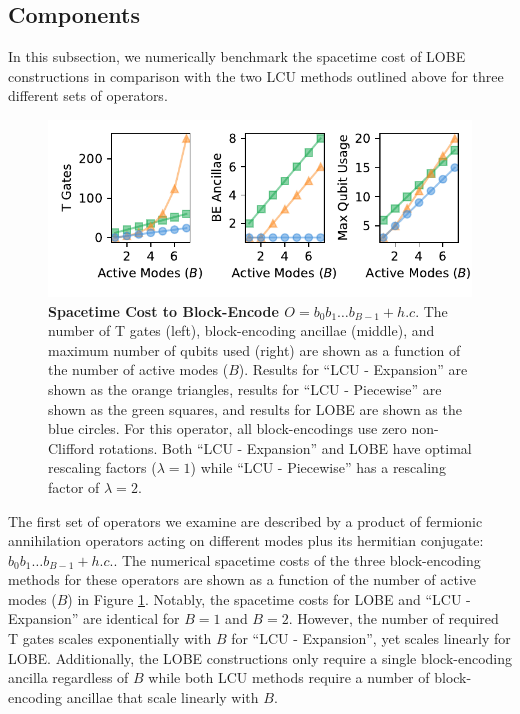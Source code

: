 \subsection{Components}

In this subsection, we numerically benchmark the spacetime cost of LOBE constructions in comparison with the two LCU methods outlined above for three different sets of operators.

\begin{figure}
    \centering
    \includegraphics[width=12cm]{figures/fermionic-hc-comparison.pdf}
    \caption{
        \textbf{Spacetime Cost to Block-Encode $O = b_0 b_1 \hdots b_{B-1} + h.c.$}
        The number of T gates (left), block-encoding ancillae (middle), and maximum number of qubits used (right) are shown as a function of the number of active modes ($B$).
        Results for ``LCU - Expansion'' are shown as the orange triangles, results for ``LCU - Piecewise'' are shown as the green squares, and results for LOBE are shown as the blue circles.
        For this operator, all block-encodings use zero non-Clifford rotations.
        Both ``LCU - Expansion'' and LOBE have optimal rescaling factors ($\lambda = 1$) while ``LCU - Piecewise'' has a rescaling factor of $\lambda = 2$.
    }
    \label{fig:fermionic-hc-comparison}
\end{figure}

The first set of operators we examine are described by a product of fermionic annihilation operators acting on different modes plus its hermitian conjugate: $b_0 b_1 \hdots b_{B-1} + h.c.$.
The numerical spacetime costs of the three block-encoding methods for these operators are shown as a function of the number of active modes ($B$) in Figure \ref{fig:fermionic-hc-comparison}.
Notably, the spacetime costs for LOBE and ``LCU - Expansion'' are identical for $B = 1$ and $B = 2$.
However, the number of required T gates scales exponentially with $B$ for ``LCU - Expansion'', yet scales linearly for LOBE.
Additionally, the LOBE constructions only require a single block-encoding ancilla regardless of $B$ while both LCU methods require a number of block-encoding ancillae that scale linearly with $B$.

